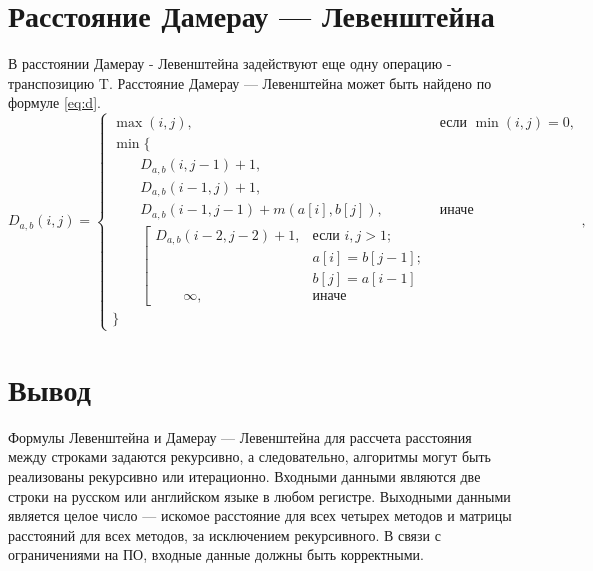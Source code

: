 \section{Расстояние Дамерау — Левенштейна}
В расстоянии Дамерау - Левенштейна задействуют еще одну операцию - транспозицию T.
Расстояние Дамерау — Левенштейна может быть найдено по формуле \ref{eq:d}.
\begin{equation}
	\label{eq:d}
	D_{a,b}(i, j) = \begin{cases}
		\max(i, j), &\text{если }\min(i, j) = 0,\\
		\min \lbrace \\
			\qquad D_{a,b}(i, j-1) + 1,\\
			\qquad D_{a,b}(i-1, j) + 1,\\
			\qquad D_{a,b}(i-1, j-1) + m(a[i], b[j]), &\text{иначе}\\
			\qquad \left[ \begin{array}{cc}D_{a,b}(i-2, j-2) + 1, &\text{если }i,j > 1;\\
			\qquad &\text{}a[i] = b[j-1]; \\
			\qquad &\text{}b[j] = a[i-1]\\
			\qquad \infty, & \text{иначе}\end{array}\right.\\
		\rbrace
		\end{cases},
\end{equation}


\section*{Вывод}

Формулы Левенштейна и Дамерау — Левенштейна для рассчета расстояния между строками задаются рекурсивно, а следовательно, алгоритмы могут быть реализованы рекурсивно или итерационно. Входными данными являются две строки на русском или английском языке в любом регистре. Выходными данными является целое число — искомое расстояние для всех четырех методов и матрицы расстояний для всех методов, за исключением рекурсивного. В связи с ограничениями на ПО, входные данные должны быть корректными.

